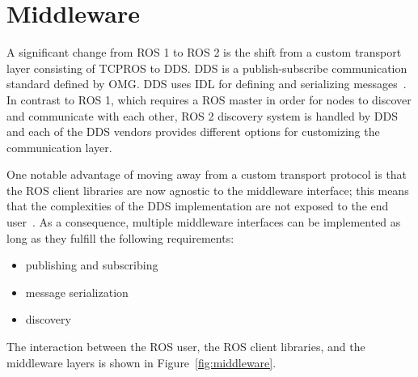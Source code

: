 \chapter{Middleware}

    A significant change from \ac{ROS} 1 to \ac{ROS} 2 is the shift from a custom transport layer consisting of \ac{TCPROS} to \ac{DDS}. \ac{DDS} is a publish-subscribe communication standard defined by \ac{OMG}. \ac{DDS} uses \ac{IDL} for defining and serializing messages~\cite{rosondds}. In contrast to \ac{ROS} 1, which requires a \ac{ROS} master in order for nodes to discover and communicate with each other, \ac{ROS} 2 discovery system is handled by \ac{DDS} and each of the \ac{DDS} vendors provides different options for customizing the communication layer.

    One notable advantage of moving away from a custom transport protocol is that the \ac{ROS} client libraries are now agnostic to the middleware interface; this means that the complexities of the \ac{DDS} implementation are not exposed to the end user~\cite{ros2middle}. As a consequence, multiple middleware interfaces can be implemented as long as they fulfill the following requirements: 
    \begin{itemize}
        \item publishing and subscribing
        \item message serialization
        \item discovery
    \end{itemize}
    
    The interaction between the \ac{ROS} user, the \ac{ROS} client libraries, and the middleware layers is shown in Figure~\ref{fig:middleware}.

